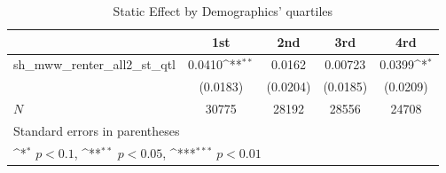 \begin{table}[htbp]\centering
\def\sym#1{\ifmmode^{#1}\else\(^{#1}\)\fi}
\caption{Static Effect by Demographics' quartiles}
\begin{tabular}{l*{4}{c}}
\hline\hline
            &\multicolumn{1}{c}{1st}&\multicolumn{1}{c}{2nd}&\multicolumn{1}{c}{3rd}&\multicolumn{1}{c}{4rd}\\
\hline
sh\_mww\_renter\_all2\_st\_qtl&      0.0410\sym{**} &      0.0162         &     0.00723         &      0.0399\sym{*}  \\
            &    (0.0183)         &    (0.0204)         &    (0.0185)         &    (0.0209)         \\
\hline
\(N\)       &       30775         &       28192         &       28556         &       24708         \\
\hline\hline
\multicolumn{5}{l}{\footnotesize Standard errors in parentheses}\\
\multicolumn{5}{l}{\footnotesize \sym{*} \(p<0.1\), \sym{**} \(p<0.05\), \sym{***} \(p<0.01\)}\\
\end{tabular}
\end{table}
